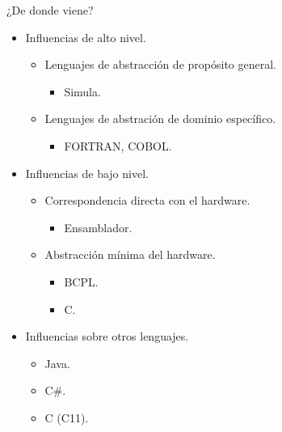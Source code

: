 \begin{frame}{¿De donde viene?}
\begin{itemize}
  \item \pause Influencias de alto nivel.
    \begin{itemize}
      \item Lenguajes de abstracción de propósito general.
        \begin{itemize}
          \item Simula.
        \end{itemize}
      \item Lenguajes de abstración de dominio específico.
        \begin{itemize}
          \item FORTRAN, COBOL.
        \end{itemize}
    \end{itemize}
  \item \pause Influencias de bajo nivel.
    \begin{itemize}
      \item Correspondencia directa con el hardware.
        \begin{itemize}
          \item Ensamblador.
        \end{itemize}
      \item Abstracción mínima del hardware.
        \begin{itemize}
          \item BCPL.
          \item C.
        \end{itemize}
    \end{itemize}
  \item \pause Influencias sobre otros lenguajes.
    \begin{itemize}
      \item Java.
      \item C\#.
      \item C (C11).
    \end{itemize}
\end{itemize}
\end{frame}

